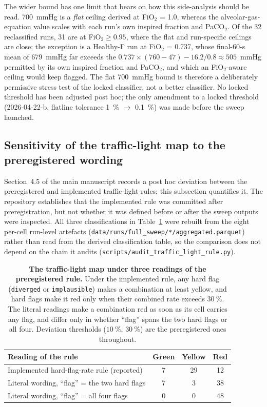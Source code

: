 \documentclass[pdflatex,sn-nature]{sn-jnl}%
\newcommand{\mainref}[2]{#2}
\begin{document}
The wider bound has one limit that bears on how this side-analysis should be read. 700~mmHg is a \emph{flat} ceiling derived at FiO$_2$ = 1.0, whereas the alveolar-gas-equation value scales with each run's own inspired fraction and PaCO$_2$. Of the 32 reclassified runs, 31 are at FiO$_2 \geq 0.95$, where the flat and run-specific ceilings are close; the exception is a Healthy-F run at FiO$_2$ = 0.737, whose final-60-s mean of 679~mmHg far exceeds the $0.737 \times (760 - 47) - 16.2 / 0.8 \approx 505$~mmHg permitted by its own inspired fraction and PaCO$_2$, and which an FiO$_2$-aware ceiling would keep flagged. The flat 700~mmHg bound is therefore a deliberately permissive stress test of the locked classifier, not a better classifier. No locked threshold has been adjusted post hoc; the only amendment to a locked threshold (2026-04-22-b, flatline tolerance 1~\% $\rightarrow$ 0.1~\%) was made before the sweep launched.

\subsection{Sensitivity of the traffic-light map to the preregistered wording}\label{sec:s3-tl-sensitivity}

Section~\mainref{sec:methods-traffic}{4.5} of the main manuscript records a post hoc deviation between the preregistered and implemented traffic-light rules; this subsection quantifies it. The repository establishes that the implemented rule was committed after preregistration, but not whether it was defined before or after the sweep outputs were inspected. All three classifications in Table~\ref{tab:s3-tl-sensitivity} were rebuilt from the eight per-cell run-level artefacts (\texttt{data/runs/full\_sweep/*/aggregated.parquet}) rather than read from the derived classification table, so the comparison does not depend on the chain it audits (\texttt{scripts/audit\_traffic\_light\_rule.py}).

\begin{table}[htbp]
\centering
\caption{\textbf{The traffic-light map under three readings of the preregistered rule.} Under the implemented rule, any hard flag (\texttt{diverged} or \texttt{implausible}) makes a combination at least yellow, and hard flags make it red only when their combined rate exceeds $30~\%$. The literal readings make a combination red as soon as its cell carries any flag, and differ only in whether ``flag'' spans the two hard flags or all four. Deviation thresholds ($10~\%$, $30~\%$) are the preregistered ones throughout.}
\label{tab:s3-tl-sensitivity}
\begin{tabular}{lccc}
\toprule
Reading of the rule & Green & Yellow & Red \\
\midrule
Implemented hard-flag-rate rule (reported) & 7 & 29 & 12 \\
Literal wording, ``flag'' = the two hard flags & 7 & 3 & 38 \\
Literal wording, ``flag'' = all four flags & 0 & 0 & 48 \\
\bottomrule
\end{tabular}
\end{table}
\end{document}
